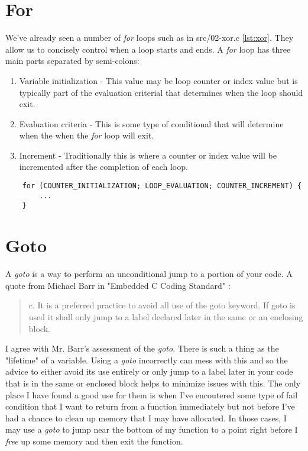 \documentclass[../main.tex]{subfiles}
\begin{document}
	\section{For}
	We've already seen a number of \textit{for} loops such as in src/02-xor.c \ref{lst:xor}.  They allow us to concisely control when a loop starts and ends. A \textit{for} loop has three main parts separated by semi-colons:
	
	\begin{enumerate}
		\item Variable initialization - This value may be loop counter or index value but is typically part of the evaluation criterial that determines when the loop should exit.
		\item Evaluation criteria - This is some type of conditional that will determine when the when the \textit{for} loop will exit.
		\item Increment - Traditionally this is where a counter or index value will be incremented after the completion of each loop.
	\end{enumerate}
	
	\begin{verbatim}
	for (COUNTER_INITIALIZATION; LOOP_EVALUATION; COUNTER_INCREMENT) {
		...
	}
	\end{verbatim}
	
	\section{Goto}
	A \textit{goto} is a way to perform an unconditional jump to a portion of your code. A quote from Michael Barr in "Embedded C Coding Standard" \cite{embedded_c}:
	
	\begin{quotation}
		c. It is a preferred practice to avoid all use of the goto keyword.  If goto is used it shall only jump to a label declared later in the same or an enclosing block.
	\end{quotation}

	I agree with Mr. Barr's assessment of the \textit{goto}.  There is such a thing as the "lifetime" of a variable.  Using a \textit{goto} incorrectly can mess with this and so the advice to either avoid its use entirely or only jump to a label later in your code that is in the same or enclosed block helps to minimize issues with this. The only place I have found a good use for them is when I've encoutered some type of fail condition that I want to return from a function immediately but not before I've had a chance to clean up memory that I may have allocated.  In those cases, I may use a \textit{goto} to jump near the bottom of my function to a point right before I \textit{free} up some memory and then exit the function. 
	
	
\end{document}
